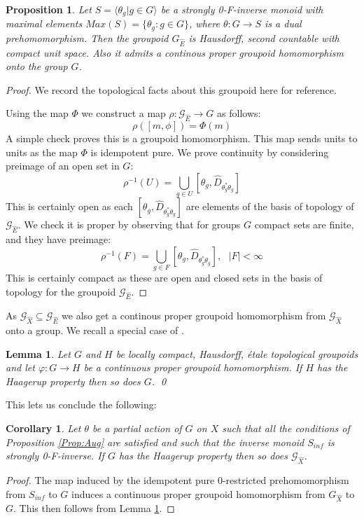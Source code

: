 \documentclass[11pt]{amsart}
\theoremstyle{plain}
\newtheorem{lemma}[theorem]{Lemma}%
\newtheorem{proposition}[theorem]{Proposition}%
\newtheorem{corollary}[theorem]{Corollary}%
\theoremstyle{definition}%
\theoremstyle{remark}%
\newcommand{\G}{\mathcal{G}}
\newcommand{\E}{\widehat{E}}
\begin{document}
\begin{proposition}\label{Prop:GrpoidHom}
Let $S = \langle \theta_{g} | g \in G \rangle$ be a strongly 0-F-inverse monoid with maximal elements $Max(S)= \lbrace \theta_{g}:g \in G \rbrace$, where $\theta: G \rightarrow S$ is a dual prehomomorphism. Then the groupoid $G_{\E}$ is Hausdorff, second countable with compact unit space. Also it admits a continous proper groupoid homomorphism onto the group $G$.
\end{proposition}
\begin{proof}
We record the topological facts about this groupoid here for reference.

Using the map $\Phi$ we construct a map $\rho: \G_{\E} \rightarrow G$ as follows:
\begin{equation*}
\rho([m,\phi]) = \Phi(m)
\end{equation*}
A simple check proves this is a groupoid homomorphism. This map sends units to units as the map $\Phi$ is idempotent pure. We prove continuity by considering preimage of an open set in $G$:
\begin{equation*}
\rho^{-1}(U)=\bigcup_{g \in U}[\theta_{g},\widehat{D}_{\theta^{*}_{g}\theta_{g}}]
\end{equation*}
This is certainly open as each $[\theta_{g},\widehat{D}_{\theta^{*}_{g}\theta_{g}}]$ are elements of the basis of topology of $\G_{\E}$. We check it is proper by observing that for groups $G$ compact sets are finite, and they have preimage:
\begin{equation*}
\rho^{-1}(F)=\bigcup_{g \in F}[\theta_{g},\widehat{D}_{\theta^{*}_{g}\theta_{g}}], \mbox{ } \vert F \vert < \infty 
\end{equation*}
This is certainly compact as these are open and closed sets in the basis of topology for the groupoid $\G_{\E}$.\end{proof}

As $\G_{\widehat{X}} \subseteq \G_{\E}$ we also get a continous proper groupoid homomorphism from $\G_{\widehat{X}}$ onto a group. We recall a special case of \cite[Lemme 3.12]{MR1703305}.

\begin{lemma}\label{Lem:Lemme}
Let $G$ and $H$ be locally compact, Hausdorff, \'etale topological groupoids and let $\varphi: G \rightarrow H$ be a continuous proper groupoid homomorphism. If $H$ has the Haagerup property then so does $G$. \qed
\end{lemma}

This lets us conclude the following:
\begin{corollary}\label{Cor:Gpoid}
Let $\theta$ be a partial action of $G$ on $X$ such that all the conditions of Proposition \ref{Prop:Aug} are satisfied and such that the inverse monoid $S_{inf}$ is strongly 0-F-inverse. If $G$ has the Haagerup property then so does $\G_{\widehat{X}}$.
\end{corollary}
\begin{proof}
The map induced by the idempotent pure 0-restricted prehomomorphism from $S_{inf}$ to $G$ induces a continuous proper groupoid homomorphism from $G_{\widehat{X}}$ to $G$. This then follows from Lemma \ref{Lem:Lemme}.\end{proof}
\end{document}
